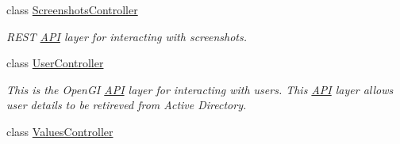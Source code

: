 \begin{DoxyCompactItemize}
class \hyperlink{class_open_1_1_g_i_1_1hypermart_1_1_controllers_1_1_a_p_i_1_1_screenshots_controller}{Screenshots\+Controller}
\begin{DoxyCompactList}\small\item\em R\+E\+ST \hyperlink{namespace_open_1_1_g_i_1_1hypermart_1_1_controllers_1_1_a_p_i}{A\+PI} layer for interacting with screenshots. \end{DoxyCompactList}\item 
class \hyperlink{class_open_1_1_g_i_1_1hypermart_1_1_controllers_1_1_a_p_i_1_1_user_controller}{User\+Controller}
\begin{DoxyCompactList}\small\item\em This is the Open\+GI \hyperlink{namespace_open_1_1_g_i_1_1hypermart_1_1_controllers_1_1_a_p_i}{A\+PI} layer for interacting with users. This \hyperlink{namespace_open_1_1_g_i_1_1hypermart_1_1_controllers_1_1_a_p_i}{A\+PI} layer allows user details to be retireved from Active Directory. \end{DoxyCompactList}\item 
class \hyperlink{class_open_1_1_g_i_1_1hypermart_1_1_controllers_1_1_a_p_i_1_1_values_controller}{Values\+Controller}
\end{DoxyCompactItemize}

